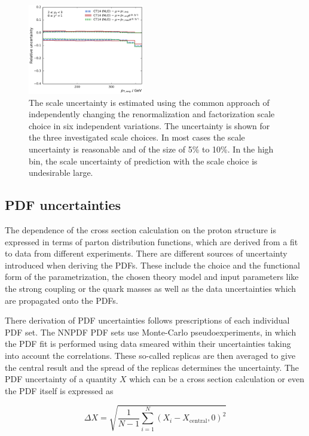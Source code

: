 \begin{figure}[htp]
    \includegraphics[width=0.45\textwidth]{figures/theory/scale_uncert_comp_yb2ys0.pdf}
    \caption{The scale uncertainty is estimated using the common approach of
        independently changing the renormalization and factorization scale
        choice in six independent variations. The uncertainty is shown for the
        three investigated scale choices. In most cases the scale uncertainty is
        reasonable and of the size of 5\% to 10\%. In the high \ystar bin, the
        scale uncertainty of prediction with the \ptavg scale choice is
        undesirable large.}
    \label{fig:scale_uncertainties}
\end{figure}

\subsection{PDF uncertainties}

The dependence of the cross section calculation on the proton structure is
expressed in terms of parton distribution functions, which are derived from a
fit to data from different experiments. There are different sources of
uncertainty introduced when deriving the PDFs. These include the choice and the
functional form of the parametrization, the chosen theory model and input
parameters like the strong coupling or the quark masses as well as the data
uncertainties which are propagated onto the PDFs.

There derivation of PDF uncertainties follows prescriptions of each individual
PDF set. The NNPDF PDF sets use Monte-Carlo pseudoexperiments, in which the PDF
fit is performed using data smeared within their uncertainties taking into
account the correlations. These so-called replicas are then averaged to give the
central result and the spread of the replicas determines the uncertainty. The
PDF uncertainty of a quantity $X$ which can be a cross section calculation or
even the PDF itself is expressed as

\begin{equation*}
    \Delta X = \sqrt{\frac{1}{N-1} \sum_{i=1}^N \left( X_{i} - X_{\mathrm{central}} , 0 \right)^2}
\end{equation*}

